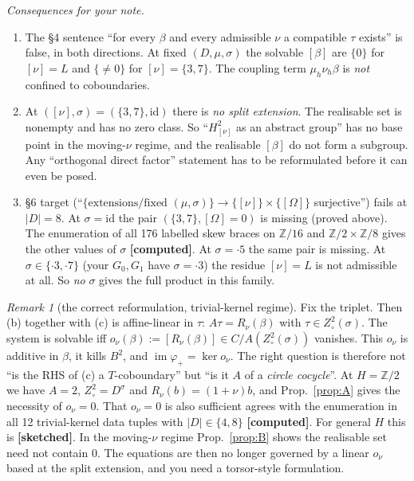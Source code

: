 \documentclass[11pt]{article}
\theoremstyle{remark}
\newtheorem{remark}[proposition]{Remark}
\newcommand{\Z}{\mathbb Z}
\newcommand{\grade}[1]{\textbf{[#1]}}
\begin{document}
\noindent\emph{Consequences for your note.}
\begin{enumerate}[label=(\arabic*)]
\item The \S4 sentence ``for every $\beta$ and every admissible $\nu$ a compatible $\tau$ exists'' is false, in both
  directions. At fixed $(D,\mu,\sigma)$ the solvable $[\beta]$ are $\{0\}$ for $[\nu]=L$ and $\{\ne0\}$ for
  $[\nu]=\{3,7\}$. The coupling term $\mu_h\nu_h\beta$ is \emph{not} confined to coboundaries.
\item At $([\nu],\sigma)=(\{3,7\},\mathrm{id})$ there is \emph{no split extension}. The realisable set is nonempty and
  has no zero class. So ``$H^2_{[\nu]}$ as an abstract group'' has no base point in the moving-$\nu$ regime, and the
  realisable $[\beta]$ do not form a subgroup. Any ``orthogonal direct factor'' statement has to be reformulated
  before it can even be posed.
\item \S6 target (``$\{\text{extensions}/\text{fixed }(\mu,\sigma)\}\to\{[\nu]\}\times\{[\Omega]\}$ surjective'') fails
  at $|D|=8$. At $\sigma=\mathrm{id}$ the pair $(\{3,7\},[\Omega]=0)$ is missing (proved above). The enumeration of all
  176 labelled skew braces on $\Z/16$ and $\Z/2\times\Z/8$ gives the other values of $\sigma$ \grade{computed}. At $\sigma=\cdot5$
  the same pair is missing. At $\sigma\in\{\cdot3,\cdot7\}$ (your $G_0,G_1$ have $\sigma=\cdot3$) the residue $[\nu]=L$ is
  not admissible at all. So \emph{no} $\sigma$ gives the full product in this family.
\end{enumerate}

\begin{remark}[the correct reformulation, trivial-kernel regime]
Fix the triplet. Then (b) together with (c) is affine-linear in $\tau$: $A\tau=R_\nu(\beta)$ with $\tau\in Z^2_\circ(\sigma)$.
The system is solvable iff $o_\nu(\beta):=[R_\nu(\beta)]\in C/A(Z^2_\circ(\sigma))$ vanishes. This $o_\nu$ is additive in
$\beta$, it kills $B^2$, and $\operatorname{im}\varphi_+=\ker o_\nu$. The right question is therefore not ``is the RHS of (c)
a $T$-coboundary'' but ``is it $A$ of a \emph{circle cocycle}''. At $H=\Z/2$ we have $A=2$, $Z^2_\circ=D^\sigma$ and
$R_\nu(b)=(1+\nu)b$, and Prop.~\ref{prop:A} gives the necessity of $o_\nu=0$. That $o_\nu=0$ is also sufficient agrees with the enumeration in all 12
trivial-kernel data tuples with $|D|\in\{4,8\}$ \grade{computed}. For general $H$ this is \grade{sketched}. In the moving-$\nu$
regime Prop.~\ref{prop:B} shows the realisable set need not contain $0$. The equations are then no longer governed by a
linear $o_\nu$ based at the split extension, and you need a torsor-style formulation.
\end{remark}
\end{document}
